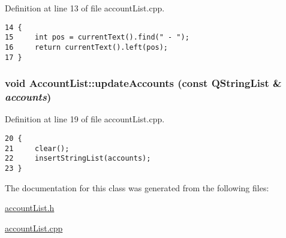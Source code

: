 Definition at line 13 of file account\-List.cpp.

\footnotesize\begin{verbatim}14 {
15     int pos = currentText().find(" - ");
16     return currentText().left(pos);
17 }
\end{verbatim}\normalsize 


\hypertarget{classAccountList_a2}{
\subsubsection[updateAccounts]{\setlength{\rightskip}{0pt plus 5cm}void Account\-List::update\-Accounts (const QString\-List \& {\em accounts})}}
\label{classAccountList_a2}


Definition at line 19 of file account\-List.cpp.

\footnotesize\begin{verbatim}20 {
21     clear();
22     insertStringList(accounts);
23 }
\end{verbatim}\normalsize 




The documentation for this class was generated from the following files:\begin{CompactItemize}
\item 
\hyperlink{accountList_8h}{account\-List.h}\item 
\hyperlink{accountList_8cpp}{account\-List.cpp}\end{CompactItemize}
